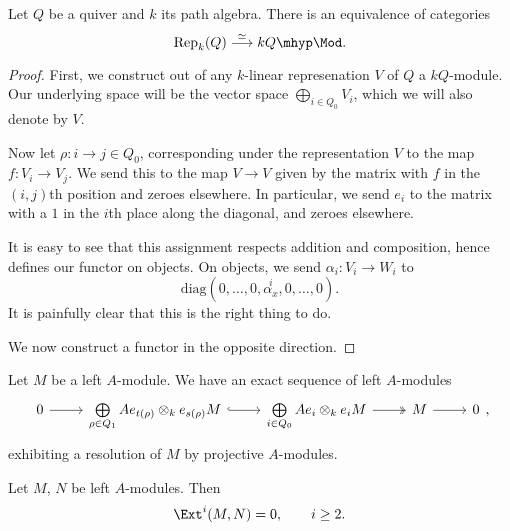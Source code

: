 \documentclass[main.tex]{subfiles}
\begin{document}
\begin{proposition}
  Let $Q$ be a quiver and $k$ its path algebra. There is an equivalence of categories
  \begin{equation*}
    \mathrm{Rep}_{k}(Q) \overset{\simeq}{\longrightarrow} kQ\mhyp\Mod.
  \end{equation*}
\end{proposition}
\begin{proof}
  First, we construct out of any $k$-linear represenation $V$ of $Q$ a $kQ$-module. Our underlying space will be the vector space $\bigoplus_{i \in Q_{0}} V_{i}$, which we will also denote by $V$.

  Now let $\rho\colon i \to j \in Q_{0}$, corresponding under the representation $V$ to the map $f\colon V_{i} \to V_{j}$. We send this to the map $V \to V$ given by the matrix with $f$ in the $(i, j)$th position and zeroes elsewhere. In particular, we send $e_{i}$ to the matrix with a $1$ in the $i$th place along the diagonal, and zeroes elsewhere.

  It is easy to see that this assignment respects addition and composition, hence defines our functor on objects. On objects, we send $\alpha_{i}\colon V_{i} \to W_{i}$ to
  \begin{equation*}
    \mathrm{diag}(0,\ldots, 0, \overset{i}{\alpha_{x}}, 0, \ldots, 0).
  \end{equation*}
  It is painfully clear that this is the right thing to do.

  We now construct a functor in the opposite direction.
\end{proof}

\begin{proposition}
  Let $M$ be a left $A$-module. We have an exact sequence of left $A$-modules
  \begin{equation*}
    \begin{tikzcd}
      0
      \arrow[r]
      & \bigoplus\limits_{\rho \in Q_{1}}Ae_{t(\rho)} \otimes_{k} e_{s(\rho)}M
      \arrow[r, hook]
      & \bigoplus\limits_{i \in Q_{0}}Ae_{i} \otimes_{k} e_{i}M
      \arrow[r, two heads]
      & M
      \arrow[r]
      & 0
    \end{tikzcd},
  \end{equation*}
  exhibiting a resolution of $M$ by projective $A$-modules.
\end{proposition}

\begin{corollary}
  Let $M$, $N$ be left $A$-modules. Then
  \begin{equation*}
    \Ext^{i}(M, N) = 0,\qquad i \geq 2.
  \end{equation*}
\end{corollary}
\end{document}
